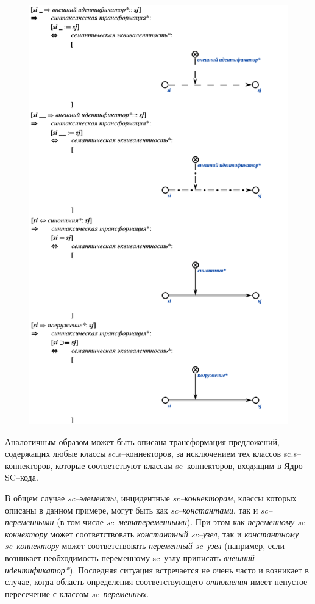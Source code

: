 \newpage
\begin{figure}[h]
	\includegraphics[scale=0.5]{images/intro/scs/sc.s-connectors/examples/example_4.png}
\end{figure}

Аналогичным образом может быть описана трансформация предложений, содержащих любые классы sc.s--коннекторов, за исключением тех классов sc.s--коннекторов, которые соответствуют классам sc--коннекторов, входящим в Ядро SC--кода.

В общем случае \textit{sc--элементы}, инцидентные \textit{sc--коннекторам}, классы которых описаны в данном примере, могут быть как \textit{sc--константами}, так и \textit{sc--переменными} (в том числе \textit{sc--метапеременными}). При этом как \textit{переменному sc--коннектору} может соответствовать \textit{константный sc--узел}, так и \textit{константному sc--коннектору} может соответствовать \textit{переменный sc--узел} (например, если возникает необходимость переменному sc--узлу приписать \textit{внешний идентификатор*}). Последняя ситуация встречается не очень часто и возникает в случае, когда область определения соответствующего \textit{отношения} имеет непустое пересечение с классом \textit{sc--переменных}.


